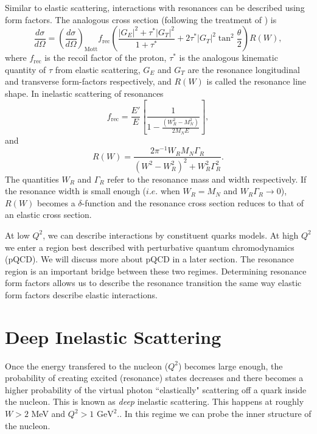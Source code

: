 Similar to elastic scattering, interactions with resonances can be described using form factors. The analogous cross section (following the treatment of \cite{stoler}) is
\begin{equation}
\frac{d\sigma}{d\Omega} = \left( \frac{d\sigma}{d\Omega} \right)_{\mathrm{Mott}} f_{\mathrm{rec}} \left( \frac{|G_E|^2+\tau^*|G_T|^2}{1+\tau^*} + 2\tau^* |G_T|^2 \tan^2 \frac{\theta}{2} \right) R(W),
\end{equation}
where $f_{\mathrm{rec}}$ is the recoil factor of the proton, $\tau^*$ is the analogous kinematic quantity of $\tau$ from elastic scattering, $G_E$ and $G_T$ are the resonance longitudinal and transverse form-factors respectively, and $R(W)$ is called the resonance line shape. In inelastic scattering of resonances
\begin{equation}
f_{\mathrm{rec}} = \frac{E'}{E} \left[ \frac{1}{1-\frac{(W_R^2 - M_N^2)}{2M_NE}} \right],
\end{equation}
and
\begin{equation}
R(W) = \frac{2\pi^{-1}W_R M_N \Gamma_R}{(W^2-W_R^2)^2 + W_R^2 \Gamma_R^2}.
\end{equation}
The quantities $W_R$ and $\Gamma_R$ refer to the resonance mass and width respectively. If the resonance width is small enough ($i.e.$ when $W_R=M_N$ and $W_R \Gamma_R \rightarrow 0$), $R(W)$ becomes a $\delta$-function and the resonance cross section reduces to that of an elastic cross section. 

At low $Q^2$, we can describe interactions by constituent quarks models. At high $Q^2$ we enter a region best described with perturbative quantum chromodynamics (pQCD). We will discuss more about pQCD in a later section. The resonance region is an important bridge between these two regimes. Determining resonance form factors allows us to describe the resonance transition the same way elastic form factors describe elastic interactions.

\section{Deep Inelastic Scattering}
Once the energy transfered to the nucleon ($Q^2$) becomes large enough, the probability of creating excited (resonance) states decreases and there becomes a higher probability of the virtual photon ``elastically" scattering off a quark inside the nucleon. This is known as \textit{deep} inelastic scattering. This happens at roughly $W > 2$ MeV and $Q^2 > 1$ $\mathrm{GeV}^2$.. In this regime we can probe the inner structure of the nucleon. 

